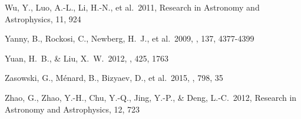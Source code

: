 \documentclass[12pt, letterpaper, preprint]{aastex}
\begin{document}
\begin{thebibliography}{24}
 Wu, Y., Luo, A.-L., Li, 
H.-N., et al.\ 2011, Research in Astronomy and Astrophysics, 11, 924 

 Yanny, B., Rockosi, C., 
Newberg, H.~J., et al.\ 2009, \aj, 137, 4377-4399 

 Yuan, H.~B., \& Liu, X.~W.\ 2012, \mnras, 425, 1763 

 Zasowski, G., 
M{\'e}nard, B., Bizyaev, D., et al.\ 2015, \apj, 798, 35 

 Zhao, G., Zhao, Y.-H., 
Chu, Y.-Q., Jing, Y.-P., 
\& Deng, L.-C.\ 2012, Research in Astronomy and Astrophysics, 12, 723 

\end{thebibliography}
\end{document}

